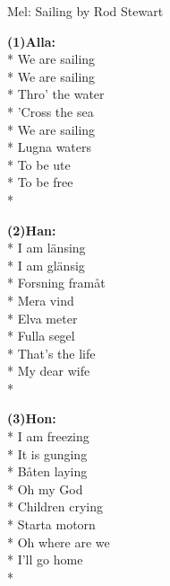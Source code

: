 \begin{SongText}[Sailing]
    \begin{SongInfo}
        Mel: Sailing by Rod Stewart
    \end{SongInfo}
    \begin{multicols}{2}
        \begin{SongVerse}
            \textbf{(1)Alla:}\\*%
            We are sailing\\*%
            We are sailing\\*%
            Thro' the water\\*%
            'Cross the sea\\*%
            We are sailing\\*%
            Lugna waters\\*%
            To be ute\\*%
            To be free\\*%
        \end{SongVerse}
        \begin{SongVerse}
            \textbf{(2)Han:}\\*%
            I am länsing\\*%
            I am glänsig\\*%
            Forsning framåt\\*%
            Mera vind\\*%
            Elva meter\\*%
            Fulla segel\\*%
            That's the life\\*%
            My dear wife\\*%
        \end{SongVerse}
        \begin{SongVerse}
            \textbf{(3)Hon:}\\*%
            I am freezing\\*%
            It is gunging\\*%
            Båten laying\\*%
            Oh my God\\*%
            Children crying\\*%
            Starta motorn\\*%
            Oh where are we\\*%
            I'll go home\\*%
        \end{SongVerse}

\end{multicols}
\end{SongText}
